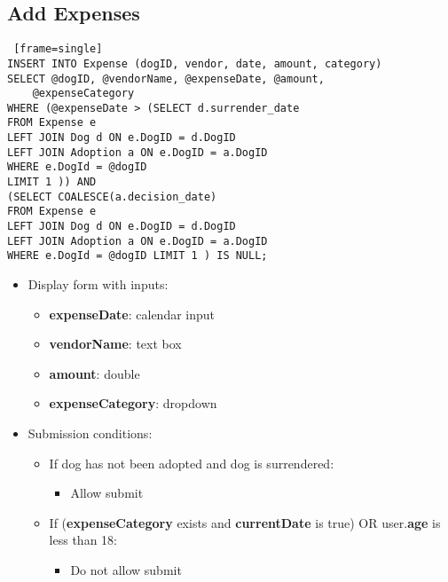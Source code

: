 \documentclass{article}
\begin{document}
\subsection{Add Expenses}
\begin{Verbatim} [frame=single]
INSERT INTO Expense (dogID, vendor, date, amount, category)
SELECT @dogID, @vendorName, @expenseDate, @amount, 
    @expenseCategory
WHERE (@expenseDate > (SELECT d.surrender_date
FROM Expense e
LEFT JOIN Dog d ON e.DogID = d.DogID
LEFT JOIN Adoption a ON e.DogID = a.DogID
WHERE e.DogId = @dogID
LIMIT 1 )) AND
(SELECT COALESCE(a.decision_date)
FROM Expense e
LEFT JOIN Dog d ON e.DogID = d.DogID
LEFT JOIN Adoption a ON e.DogID = a.DogID
WHERE e.DogId = @dogID LIMIT 1 ) IS NULL;
\end{Verbatim}
\begin{itemize}
    \item Display form with inputs:
    \begin{itemize}
        \item \textbf{expenseDate}: calendar input
        \item \textbf{vendorName}: text box
        \item \textbf{amount}: double
        \item \textbf{expenseCategory}: dropdown
    \end{itemize}
    \item Submission conditions:
    \begin{itemize}
        \item If dog has not been adopted and dog is surrendered:
        \begin{itemize}
            \item Allow submit
        \end{itemize}
        \item If (\textbf{expenseCategory} exists and \textbf{currentDate} is true) OR user.\textbf{age} is less than 18:
        \begin{itemize}
            \item Do not allow submit
        \end{itemize}
    \end{itemize}
\end{itemize}
\end{document}
